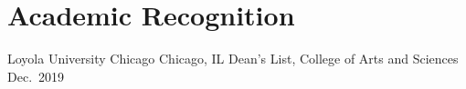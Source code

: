 \section*{Academic Recognition}

\cventry
    {Loyola University Chicago}
    {Chicago, IL}
    {Dean's List, College of Arts and Sciences}
    {Dec.\ 2019}